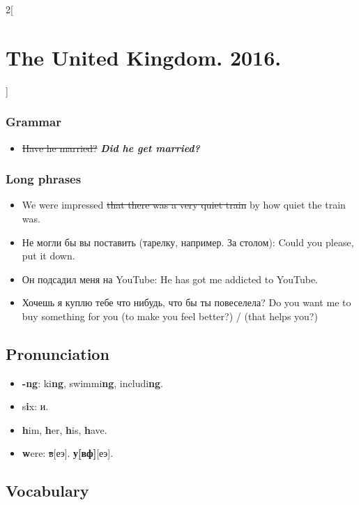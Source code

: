 \documentclass[10pt,a4paper]{article}
\newlength{\OriginalParIndent}
\newcommand\ex[1]{\textit{\textbf{{#1}}}}           %
\newenvironment{ItemizeWithOrigParIndent}
    {\begin{itemize}[leftmargin=\OriginalParIndent]}
    {\end{itemize}}
\begin{document}
\begin{multicols}{2}[\section{The United Kingdom. 2016.}]
\subsubsection{Grammar}
\begin{ItemizeWithOrigParIndent}
   \item \sout{Have he married?} \ex{Did he get married?}
\end{ItemizeWithOrigParIndent}

\subsubsection{Long phrases}
\begin{ItemizeWithOrigParIndent}
   \item We were impressed \sout{that there was a very quiet train} by how quiet the train was.
   \item Не могли бы вы поставить (тарелку, например. За столом): Could you please, put it down.
   \item Он подсадил меня на YouTube: He has got me addicted to YouTube.
   \item Хочешь я куплю тебе что нибудь, что бы ты повеселела? Do you want me to buy something
   for you (to make you feel better?) / (that helps you?)
\end{ItemizeWithOrigParIndent}



\subsection{Pronunciation}
\begin{ItemizeWithOrigParIndent}
  \item \textbf{-ng}: ki\textbf{ng}, swimmi\textbf{ng}, includi\textbf{ng}.
  \item s\textbf{i}x: и.
  \item \textbf{h}im, \textbf{h}er, \textbf{h}is, \textbf{h}ave.
  \item \textbf{w}ere: \sout{в}[еэ]. \textbf{у[вф]}[еэ].
\end{ItemizeWithOrigParIndent}



\subsection{Vocabulary}


\end{multicols}
\end{document}
